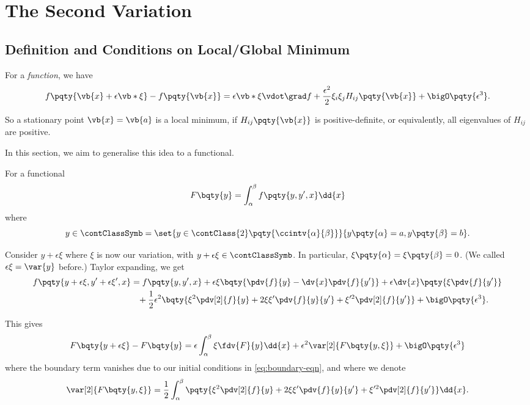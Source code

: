 \section{The Second Variation}

\subsection{Definition and Conditions on Local/Global Minimum}

For a \emph{function}, we have
\[
    f\pqty{\vb{x} + \epsilon \vb*{\xi}} - f\pqty{\vb{x}} = \epsilon \vb*{\xi} \vdot \grad f + \frac{\epsilon^2}{2} \xi_i \xi_j H_{ij} \pqty{\vb{x}} + \bigO \pqty{\epsilon^3}.
\]

So a stationary point \(\vb{x} = \vb{a}\) is a local minimum, if \(H_{ij} \pqty{\vb{x}}\) is positive-definite, or equivalently, all eigenvalues of \(H_{ij}\) are positive.

In this section, we aim to generalise this idea to a functional.

For a functional
\[
    F \bqty{y} = \int_{\alpha}^{\beta} f\pqty{y, y', x} \dd{x}
\]
where
\begin{equation}
    \label{eq:boundary-eqn}%
    y \in \contClassSymb = \set{y \in \contClass{2} \pqty{\ccintv{\alpha}{\beta}}}{y\pqty{\alpha} = a, y\pqty{\beta} = b}.
\end{equation}

Consider \(y + \epsilon \xi\) where \(\xi\) is now our variation, with \(y + \epsilon \xi \in \contClassSymb\). In particular, \(\xi\pqty{\alpha} = \xi\pqty{\beta} = 0\). (We called \(\epsilon \xi = \var{y}\) before.) Taylor expanding, we get
\begin{align*}
    f\pqty{y + \epsilon \xi, y' + \epsilon \xi', x} &= f\pqty{y, y', x} + \epsilon \xi \bqty{\pdv{f}{y} - \dv{x} \pdv{f}{y'}} + \epsilon \dv{x} \pqty{\xi \pdv{f}{y'}} \\
    &\phantom{=} + \frac{1}{2} \epsilon^2 \bqty{\xi^2 \pdv[2]{f}{y} + 2 \xi \xi' \pdv{f}{y}{y'} + \xi'^2 \pdv[2]{f}{{y'}}} + \bigO\pqty{\epsilon^3}.
\end{align*}

This gives
\[
    F\bqty{y + \epsilon \xi} - F\bqty{y} = \epsilon \int_{\alpha}^{\beta} \xi \fdv{F}{y} \dd{x} + \epsilon^2 \var[2]{F\bqty{y, \xi}} + \bigO\pqty{\epsilon^3}
\]
where the boundary term vanishes due to our initial conditions in \eqref{eq:boundary-eqn}, and where we denote
\[
    \var[2]{F\bqty{y, \xi}} = \frac{1}{2} \int_{\alpha}^{\beta} \pqty{\xi^2 \pdv[2]{f}{y} + 2 \xi \xi' \pdv{f}{y}{y'} + \xi'^2 \pdv[2]{f}{{y'}}} \dd{x}.
\]

